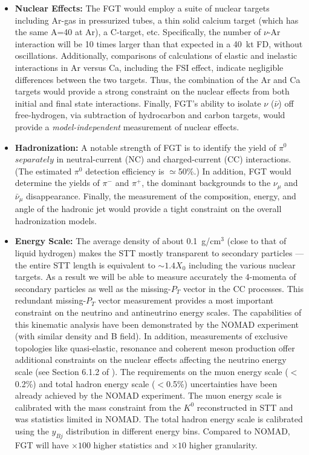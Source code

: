 \begin{itemize}
    \item {\bf Nuclear Effects:} The FGT would employ a suite of
      nuclear targets including Ar-gas in pressurized tubes, a thin
      solid calcium target (which has the same A=40 at Ar), a
      C-target, etc.  Specifically, the number of $\nu$-Ar interaction
      will be 10 times larger than that expected in a 40~kt FD,
      without oscillations. Additionally, comparisons of calculations
      of elastic and inelastic interactions in Ar versus Ca, including
      the FSI effect, indicate negligible differences between the two
      targets. Thus, the combination of the Ar and Ca targets would
      provide a strong constraint on the nuclear effects from both
      initial and final state interactions.  Finally, FGT's ability to
      isolate $\nu$ ($\bar\nu$) off free-hydrogen, via subtraction of
      hydrocarbon and carbon targets, would provide a 
      {\em model-independent} measurement of nuclear effects.

    \item {\bf Hadronization:} A notable strength of FGT is to
      identify the yield of $\pi^0$ $separately$ in neutral-current
      (NC) and charged-current (CC) interactions. (The estimated
      $\pi^0$ detection efficiency is $\simeq$50\%.) In addition, FGT
      would determine the yields of $\pi^-$ and $\pi^+$, the dominant
      backgrounds to the $\nu_\mu$ and $\bar\nu_\mu$
      disappearance. Finally, the measurement of the composition,
      energy, and angle of the hadronic jet would provide a tight
      constraint on the overall hadronization models.

    \item {\bf Energy Scale:} The average density of about
      0.1~g/cm$^3$ (close to that of liquid hydrogen) makes the STT
      mostly transparent to secondary particles --- the entire STT
      length is equivalent to $\sim 1.4 X_0$ including the various
      nuclear targets. As a result we will be able to measure
      accurately the 4-momenta of secondary particles as well as the
      missing-$P_T$ vector in the CC processes.  This redundant
      missing-$P_T$ vector measurement provides a most important
      constraint on the neutrino and antineutrino energy scales. The
      capabilities of this kinematic analysis have been demonstrated
      by the NOMAD experiment (with similar density and B field).  In
      addition, measurements of exclusive topologies like
      quasi-elastic, resonance and coherent meson production offer
      additional constraints on the nuclear effects affecting the
      neutrino energy scale (see Section 6.1.2 of \volphys).  %
The requirements on the muon energy scale
      ($<$0.2\%) and total hadron energy scale ($<$0.5\%)
      uncertainties have been already achieved by the NOMAD
      experiment. The muon energy scale is calibrated with the mass
      constraint from the $K^0$ reconstructed in STT and was
      statistics limited in NOMAD. The total hadron energy scale is
      calibrated using the $y_{Bj}$ distribution in different energy
      bins. Compared to NOMAD, FGT will have $\times 100$ higher
      statistics and $\times 10$ higher granularity.
\end{itemize}

